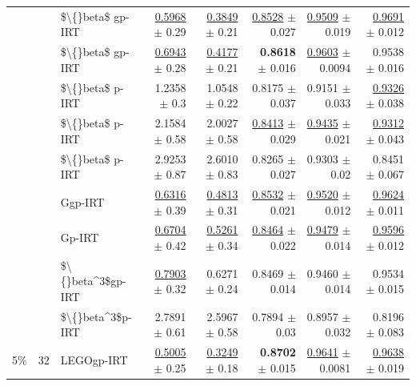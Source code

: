 \begin{longtable}{llp{}rrrrr}
 &  & \$\textbackslash\{\}beta\$ gp-IRT & \underline{0.5968} {\scriptsize $\pm$ 0.29} & \underline{0.3849} {\scriptsize $\pm$ 0.21} & \underline{0.8528} {\scriptsize $\pm$ 0.027} & \underline{0.9509} {\scriptsize $\pm$ 0.019} & \underline{0.9691} {\scriptsize $\pm$ 0.012} \\
 &  & \$\textbackslash\{\}beta\$ gp-IRT & \underline{0.6943} {\scriptsize $\pm$ 0.28} & \underline{0.4177} {\scriptsize $\pm$ 0.21} & \textbf{0.8618} {\scriptsize $\pm$ 0.016} & \underline{0.9603} {\scriptsize $\pm$ 0.0094} & 0.9538 {\scriptsize $\pm$ 0.016} \\
 &  & \$\textbackslash\{\}beta\$ p-IRT & 1.2358 {\scriptsize $\pm$ 0.3} & 1.0548 {\scriptsize $\pm$ 0.22} & 0.8175 {\scriptsize $\pm$ 0.037} & 0.9151 {\scriptsize $\pm$ 0.033} & \underline{0.9326} {\scriptsize $\pm$ 0.038} \\
 &  & \$\textbackslash\{\}beta\$ p-IRT & 2.1584 {\scriptsize $\pm$ 0.58} & 2.0027 {\scriptsize $\pm$ 0.58} & \underline{0.8413} {\scriptsize $\pm$ 0.029} & \underline{0.9435} {\scriptsize $\pm$ 0.021} & \underline{0.9312} {\scriptsize $\pm$ 0.043} \\
 &  & \$\textbackslash\{\}beta\$ p-IRT & 2.9253 {\scriptsize $\pm$ 0.87} & 2.6010 {\scriptsize $\pm$ 0.83} & 0.8265 {\scriptsize $\pm$ 0.027} & 0.9303 {\scriptsize $\pm$ 0.02} & 0.8451 {\scriptsize $\pm$ 0.067} \\
 &  & Ggp-IRT & \underline{0.6316} {\scriptsize $\pm$ 0.39} & \underline{0.4813} {\scriptsize $\pm$ 0.31} & \underline{0.8532} {\scriptsize $\pm$ 0.021} & \underline{0.9520} {\scriptsize $\pm$ 0.012} & \underline{0.9624} {\scriptsize $\pm$ 0.011} \\
 &  & Gp-IRT & \underline{0.6704} {\scriptsize $\pm$ 0.42} & \underline{0.5261} {\scriptsize $\pm$ 0.34} & \underline{0.8464} {\scriptsize $\pm$ 0.022} & \underline{0.9479} {\scriptsize $\pm$ 0.014} & \underline{0.9596} {\scriptsize $\pm$ 0.012} \\
 &  & \$\textbackslash\{\}beta\textasciicircum{}3\$gp-IRT & \underline{0.7903} {\scriptsize $\pm$ 0.32} & 0.6271 {\scriptsize $\pm$ 0.24} & 0.8469 {\scriptsize $\pm$ 0.014} & 0.9460 {\scriptsize $\pm$ 0.014} & 0.9534 {\scriptsize $\pm$ 0.015} \\
 &  & \$\textbackslash\{\}beta\textasciicircum{}3\$p-IRT & 2.7891 {\scriptsize $\pm$ 0.61} & 2.5967 {\scriptsize $\pm$ 0.58} & 0.7894 {\scriptsize $\pm$ 0.03} & 0.8957 {\scriptsize $\pm$ 0.032} & 0.8196 {\scriptsize $\pm$ 0.083} \\
\midrule
5\% & 32 & LEGOgp-IRT & \underline{0.5005} {\scriptsize $\pm$ 0.25} & \underline{0.3249} {\scriptsize $\pm$ 0.18} & \textbf{0.8702} {\scriptsize $\pm$ 0.015} & \underline{0.9641} {\scriptsize $\pm$ 0.0081} & \underline{0.9638} {\scriptsize $\pm$ 0.019} \\

\end{longtable}
